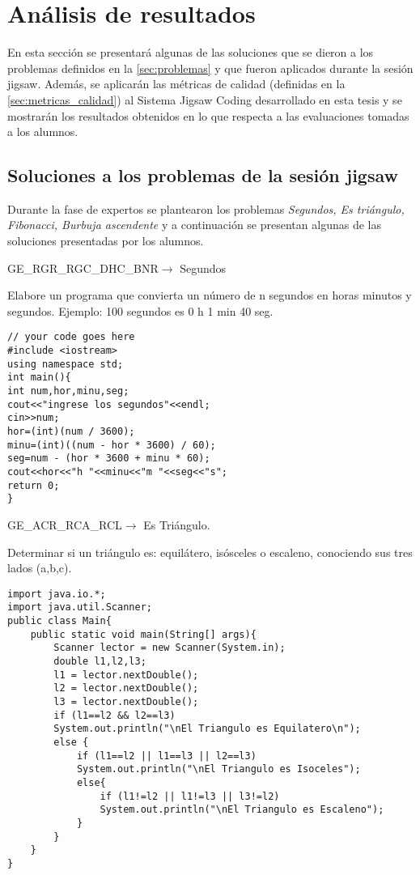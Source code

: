 \chapter{Análisis de resultados}
\label{cap:analisis_de_resultados}
En esta sección se presentará algunas de las soluciones que se dieron a los problemas definidos en la \autoref{sec:problemas} y que fueron aplicados durante la sesión jigsaw. Además, se aplicarán las métricas de calidad (definidas en la \autoref{sec:metricas_calidad}) al Sistema Jigsaw Coding desarrollado en esta tesis y se mostrarán los resultados obtenidos en lo que respecta a las evaluaciones tomadas a los alumnos.\\

\section{Soluciones a los problemas de la sesión jigsaw}
Durante la fase de expertos se plantearon los problemas \emph{Segundos, Es triángulo, Fibonacci, Burbuja ascendente} y a continuación se presentan algunas de las soluciones presentadas por los alumnos.

\begin{center}
	GE\_RGR\_RGC\_DHC\_BNR$\longrightarrow$ Segundos
\end{center}

Elabore un programa que convierta un número de n segundos en horas minutos y segundos. Ejemplo: 100 segundos es 0 h 1 min 40 seg.

\lstset{language=C++, breaklines=true, basicstyle=\footnotesize}
\begin{lstlisting}
// your code goes here
#include <iostream>  
using namespace std;  
int main(){  
int num,hor,minu,seg;  
cout<<"ingrese los segundos"<<endl;  
cin>>num;  
hor=(int)(num / 3600);  
minu=(int)((num - hor * 3600) / 60);  
seg=num - (hor * 3600 + minu * 60);  
cout<<hor<<"h "<<minu<<"m "<<seg<<"s";  
return 0;  
}  
\end{lstlisting}
\clearpage
\begin{center}
	GE\_ACR\_RCA\_RCL$\longrightarrow$ Es Triángulo.
\end{center}

Determinar si un triángulo es: equilátero, isósceles o escaleno, conociendo sus tres lados (a,b,c).

\lstset{language=Java, breaklines=true, basicstyle=\footnotesize}
\begin{lstlisting}
import java.io.*;
import java.util.Scanner;
public class Main{
	public static void main(String[] args){
		Scanner lector = new Scanner(System.in);
		double l1,l2,l3;
		l1 = lector.nextDouble();
		l2 = lector.nextDouble();
		l3 = lector.nextDouble();
		if (l1==l2 && l2==l3)
		System.out.println("\nEl Triangulo es Equilatero\n");
		else {
			if (l1==l2 || l1==l3 || l2==l3)
			System.out.println("\nEl Triangulo es Isoceles");
			else{
				if (l1!=l2 || l1!=l3 || l3!=l2)
				System.out.println("\nEl Triangulo es Escaleno");
			}
		}
	}
}
\end{lstlisting}


